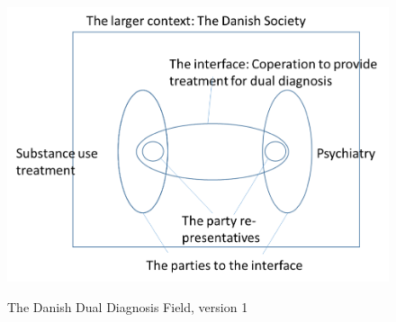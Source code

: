 \FloatBarrier
\noindent
\begin{figure}[htb]
\centering
\caption{The Danish Dual Diagnosis Field, version 1}
\includegraphics[width=0.9\linewidth]{paper6/p6_data/p6_model1.png}
\label{fig:model:1}
\end{figure}
\FloatBarrier
